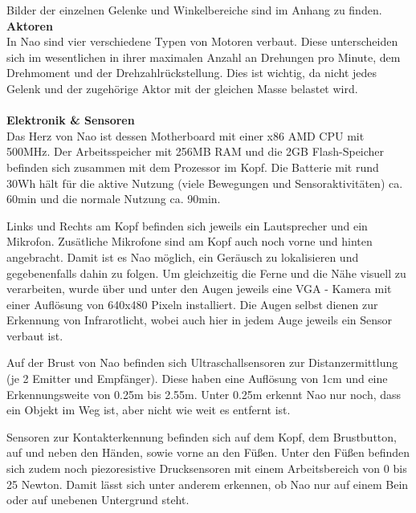 \noindent
Bilder der einzelnen Gelenke und Winkelbereiche sind im Anhang zu finden.
\newline \newline
\noindent
\textbf{Aktoren}
\\
In Nao sind vier verschiedene Typen von Motoren verbaut. Diese unterscheiden sich im wesentlichen in ihrer maximalen Anzahl an Drehungen pro Minute, dem Drehmoment und der Drehzahlrückstellung. Dies ist wichtig, da nicht jedes Gelenk und der zugehörige Aktor mit der gleichen Masse belastet wird.
\\
\\
\textbf{Elektronik \& Sensoren}
\\
Das Herz von Nao ist dessen Motherboard mit einer x86 AMD CPU mit 500MHz. Der Arbeitsspeicher mit 256MB RAM und die 2GB Flash-Speicher befinden sich zusammen mit dem Prozessor im Kopf.  Die Batterie mit rund 30Wh hält für die aktive Nutzung (viele Bewegungen und Sensoraktivitäten) ca. 60min und die normale Nutzung ca. 90min. 

Links und Rechts am Kopf befinden sich jeweils ein Lautsprecher und ein Mikrofon. Zusätliche Mikrofone sind am Kopf auch noch vorne und hinten angebracht. Damit ist es Nao möglich, ein Geräusch zu lokalisieren und gegebenenfalls dahin zu folgen. Um gleichzeitig die Ferne und die Nähe visuell zu verarbeiten, wurde über und unter den Augen jeweils eine VGA - Kamera mit einer Auflösung von 640x480 Pixeln installiert. Die Augen selbst dienen zur Erkennung von Infrarotlicht, wobei auch hier in jedem Auge jeweils ein Sensor verbaut ist.

Auf der Brust von Nao befinden sich Ultraschallsensoren zur Distanzermittlung (je 2 Emitter und Empfänger). Diese haben eine Auflösung von 1cm und eine Erkennungsweite von 0.25m bis 2.55m. Unter 0.25m erkennt Nao nur noch, dass ein Objekt im Weg ist, aber nicht wie weit es entfernt ist.

Sensoren zur Kontakterkennung befinden sich auf dem Kopf, dem Brustbutton, auf und neben den Händen, sowie vorne an den Füßen. Unter den Füßen befinden sich zudem noch piezoresistive Drucksensoren mit einem Arbeitsbereich von 0 bis 25 Newton. Damit lässt sich unter anderem erkennen, ob Nao nur auf einem Bein oder auf unebenen Untergrund steht.

